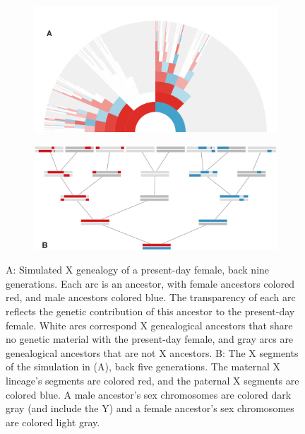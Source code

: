 \documentclass[9pt,twocolumn,twoside]{gsajnl}
\begin{document}
\begin{figure}[!ht]
    \centering
    \begin{subfigure}[b]{0.49\textwidth}
      \includegraphics[width=\textwidth]{images/x-arc}
    \end{subfigure}
    \begin{subfigure}[b]{0.49\textwidth}
      \includegraphics[width=\textwidth]{images/x-tree}
    \end{subfigure}
    
    \caption{A: Simulated X genealogy of a present-day female, back nine
      generations.  Each arc is an ancestor, with female ancestors colored red,
      and male ancestors colored blue. The transparency of each arc reflects
      the genetic contribution of this ancestor to the present-day female.
      White arcs correspond X genealogical ancestors that share no genetic
      material with the present-day female, and gray arcs are genealogical
      ancestors that are not X ancestors. B: The X segments of the simulation
      in (A), back five generations.  The maternal X lineage's segments are
      colored red, and the paternal X segments are colored blue. A male
      ancestor's sex chromosomes are colored dark gray (and include the Y) and
    a female ancestor's sex chromosomes are colored light gray.}

    \label{fig:x-arc}

  \end{figure}
\end{document}
